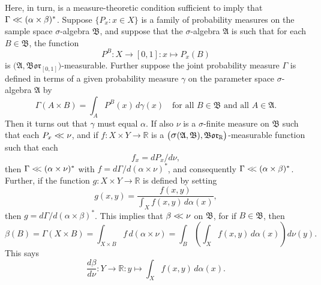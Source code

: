\documentclass[
twoside=true,
paper=letter,
fontsize=11pt,
pagesize=auto,
leqno,
openany,
headsepline,
overfullrule,
]{scrbook}
\theoremstyle{plain}
\theoremstyle{plain}
\theoremstyle{definition}
\theoremstyle{bfnoteitalic}
\theoremstyle{bfnoteroman}
\newcommand{\sigalg}[1]{\mathfrak{#1}}
\newcommand{\borel}{\mathfrak{Bor}}
\newcommand{\sagb}{\mathop{\hbox{\large{$\sigma$}}}\nolimits}
\newcommand{\textsigma}{\hbox{\large{$\sigma$}}\kern-1pt}
\newcommand{\R}{\mathbb{R}}
\newcommand{\productsig}[2]{\sagb(#1,#2)}
\newcommand{\funcf}{f}
\newcommand{\funcg}{g}
\newcommand{\function}{f}
\newcommand{\functionii}{g}
\newcommand{\measurespace}{X}
\newcommand{\measurespaceii}{Y}
\newcommand{\abscont}{\mathrel{< \kern-3.5pt <}}
\newcommand{\measnu}{\nu}
\newcommand{\pspace}{\measurespace}%
\newcommand{\sspace}{\measurespaceii}%
\newcommand{\pspaceset}{A}
\newcommand{\sspaceset}{B}
\newcommand{\pspaceelt}{x}
\newcommand{\sspaceelt}{y}
\newcommand{\sspacesig}{\sigalg{B}}
\newcommand{\pspacesig}{\sigalg{A}}
\newcommand{\joint}{\Gamma}%
\newcommand{\measonprod}{\Gamma}%
\newcommand{\marginalone}{\alpha}%
\newcommand{\marginaltwo}{\beta}%
\newcommand{\prior}{\marginalone}
\newcommand{\predictive}{\marginaltwo}
\newcommand{\wouldbeprior}{\gamma}
\begin{document}
Here, in turn, is a measure-theoretic condition sufficient to imply that
$\measonprod\abscont (\prior\times\predictive)^*$.
Suppose
$\{ P_\pspaceelt :\pspaceelt\in\pspace \}$
is a family of probability measures on the sample space \textsigma-algebra
$\sspacesig$,
and suppose that the \textsigma\hyp{}algebra $\pspacesig$ is such that for each
$\sspaceset\in\sspacesig$, the function
\[
P^\sspaceset
:\pspace \to [0,1]
:\pspaceelt \mapsto P_\pspaceelt(\sspaceset)
\]
is $\bigl(\pspacesig,\borel_{[0,1]}\bigr)$\hyp{}measurable.
Further suppose the joint probability measure $\joint$  is defined in terms of
a given probability measure $\wouldbeprior$ on the parameter space \textsigma-algebra
$\pspacesig$ by
\[
\measonprod(\pspaceset\times\sspaceset)
=
\int_\pspaceset P^\sspaceset(\pspaceelt)
\, d\wouldbeprior(\pspaceelt)
\quad
\text{for all $\sspaceset\in\sspacesig$ and all $\pspaceset \in \pspacesig$.}
\]
Then it turns out that $\wouldbeprior$ must equal $\prior$.
If also $\measnu$ is a \textsigma-finite measure on $\sspacesig$
such that each
$P_\pspaceelt\abscont \measnu$, and if
$\funcf : \pspace\times\sspace\to\R$ is a
$\bigl(\productsig{\pspacesig}{\sspacesig},\borel_\R\bigr)$\hyp{}measurable function
such that each
\begin{equation}\label{as_density}
\function_\pspaceelt
=
d P_\pspaceelt/d\measnu,
\end{equation}
then
$\joint \abscont (\prior \times\measnu)^*$
with
$\function
=
d\measonprod/d(\prior \times\measnu)^*$,
and consequently
$\measonprod\abscont (\prior\times\predictive)^*$.
Further, if the function
$\funcg: \pspace\times\sspace\to\R$ is defined by setting
\[\functionii(\pspaceelt,\sspaceelt)
=
\frac
{\function(\pspaceelt,\sspaceelt)}
{\int_\pspace \function(\pspaceelt,\sspaceelt)\,
d\prior(\pspaceelt)},
\]
then
$\functionii
=
d\measonprod/d(\prior\times\predictive)^*$.
This implies that $\predictive \abscont \measnu$ on $\sspacesig$, for if $\sspaceset\in\sspacesig$, then
\[
\predictive(\sspaceset)
= \measonprod(\pspace \times \sspaceset) 
= \int_{\pspace \times \sspaceset} \function \, d(\prior\times\measnu)
= \int_\sspaceset\left( \int_\pspace \function(\pspaceelt, \sspaceelt)\,d\prior(x)\right) d\measnu(\sspaceelt).
\]
This says 
\[
\frac{d\predictive}{d\measnu}:
\sspace\to\R:
\sspaceelt\mapsto \int_\pspace \function(\pspaceelt,\sspaceelt)\,d\prior(x).
\]
\end{document}
